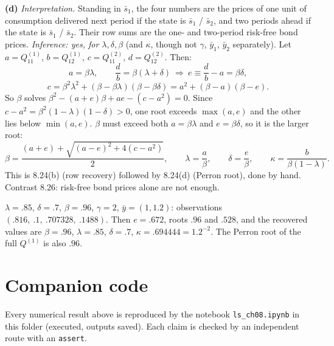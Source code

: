 \documentclass[12pt, letterpaper]{article}
\begin{document}
\begin{tcolorbox}[evenbox,title={Exercise 8.28 \quad Recovering probabilities from prices, IV}]
\textbf{(d)} \emph{Interpretation.} Standing in $\bar s_1$, the four numbers are the prices of one unit of
consumption delivered next period if the state is $\bar s_1$ / $\bar s_2$, and two periods ahead if the state is
$\bar s_1$ / $\bar s_2$. Their row sums are the one- and two-period risk-free bond prices. \emph{Inference: yes, for
$\lambda,\delta,\beta$} (and $\kappa$, though not $\gamma$, $\bar y_1$, $\bar y_2$ separately). Let
$a=Q^{(1)}_{11}$, $b=Q^{(1)}_{12}$, $c=Q^{(2)}_{11}$, $d=Q^{(2)}_{12}$. Then:
\[
a=\beta\lambda,\qquad\frac db=\beta(\lambda+\delta)\ \Rightarrow\ e\equiv\frac db-a=\beta\delta,
\]
\[
c=\beta^2\lambda^2+(\beta-\beta\lambda)(\beta-\beta\delta)=a^2+(\beta-a)(\beta-e).
\]
So $\beta$ solves $\beta^2-(a+e)\beta+ae-(c-a^2)=0$. Since $c-a^2=\beta^2(1-\lambda)(1-\delta)>0$, one root exceeds
$\max(a,e)$ and the other lies below $\min(a,e)$. $\beta$ must exceed both $a=\beta\lambda$ and $e=\beta\delta$, so it is the
larger root:
\[
\beta=\frac{(a+e)+\sqrt{(a-e)^2+4(c-a^2)}}{2},\qquad\lambda=\frac a\beta,\qquad\delta=\frac e\beta,\qquad
\kappa=\frac{b}{\beta(1-\lambda)} .
\]
This is 8.24(b) (row recovery) followed by 8.24(d) (Perron root), done by hand. Contrast 8.26: risk-free bond
prices alone are not enough.

\begin{tcolorbox}[databox]
$\lambda=.85$, $\delta=.7$, $\beta=.96$, $\gamma=2$, $\bar y=(1,1.2)$: observations $(.816,\ .1,\ .707328,\ .1488)$. Then
$e=.672$, roots $.96$ and $.528$, and the recovered values are $\beta=.96$, $\lambda=.85$, $\delta=.7$,
$\kappa=.694444=1.2^{-2}$. The Perron root of the full $Q^{(1)}$ is also $.96$.
\end{tcolorbox}
\end{tcolorbox}

\section*{Companion code}

Every numerical result above is reproduced by the notebook \texttt{ls\_ch08.ipynb} in this folder
(executed, outputs saved). Each claim is checked by an independent route with an \texttt{assert}.
\end{document}

